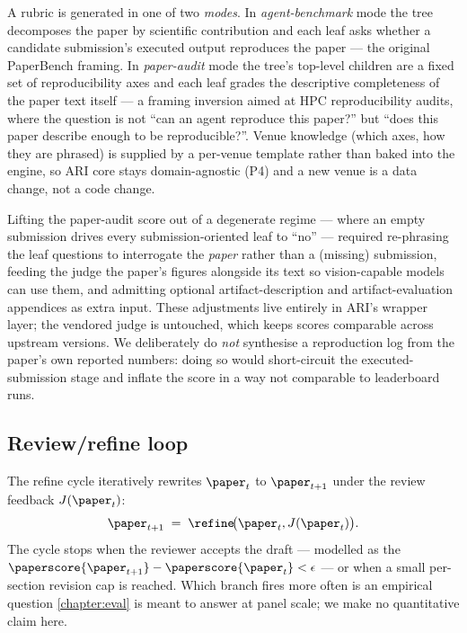 A rubric is generated in one of two \emph{modes}. In
\emph{agent-benchmark} mode the tree decomposes the paper by
scientific contribution and each leaf asks whether a candidate
submission's executed output reproduces the paper --- the original
PaperBench framing. In \emph{paper-audit} mode the tree's top-level
children are a fixed set of reproducibility axes and each leaf grades
the descriptive completeness of the paper text itself --- a framing
inversion aimed at HPC reproducibility audits, where the question is
not ``can an agent reproduce this paper?'' but ``does this paper
describe enough to be reproducible?''. Venue knowledge (which axes, how
they are phrased) is supplied by a per-venue template rather than
baked into the engine, so ARI core stays domain-agnostic (P4) and a
new venue is a data change, not a code change.

Lifting the paper-audit score out of a degenerate regime --- where an
empty submission drives every submission-oriented leaf to ``no'' ---
required re-phrasing the leaf questions to interrogate the \emph{paper}
rather than a (missing) submission, feeding the judge the paper's
figures alongside its text so vision-capable models can use them, and
admitting optional artifact-description and artifact-evaluation
appendices as extra input. These adjustments live entirely in ARI's
wrapper layer; the vendored judge is untouched, which keeps scores
comparable across upstream versions. We deliberately do \emph{not}
synthesise a reproduction log from the paper's own reported numbers:
doing so would short-circuit the executed-submission stage and inflate
the score in a way not comparable to leaderboard runs.

\subsection{Review/refine loop}\label{sec:paper:loop}

The refine cycle iteratively rewrites $\paper_t$ to $\paper_{t+1}$
under the review feedback $J(\paper_t)$:
\begin{equation}\label{eq:refine}
  \paper_{t+1} \;=\; \refine\!\bigl(\paper_t, J(\paper_t)\bigr).
\end{equation}
The cycle stops when the reviewer accepts the draft --- modelled as the
$\paperscore{\paper_{t+1}}-\paperscore{\paper_t}<\epsilon$ --- or when
a small per-section revision cap is reached. Which branch fires more
often is an empirical question \cref{chapter:eval} is meant to answer
at panel scale; we make no quantitative claim here.

